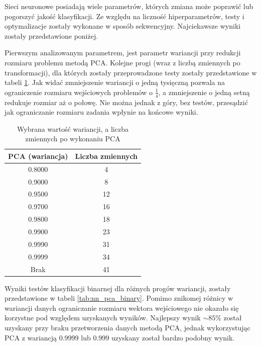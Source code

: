 \documentclass[a4paper, twoside, 11pt, openright]{article}
\begin{document}
Sieci neuronowe posiadają wiele parametrów, których zmiana może poprawić lub pogorszyć jakość klasyfikacji. Ze względu na liczność hiperparametrów, testy i optymalizacje zostały wykonane w sposób sekwencyjny. Najciekawsze wyniki zostały przedstawione poniżej.

\bigskip

Pierwszym analizowanym parametrem, jest parametr wariancji przy redukcji rozmiaru problemu metodą PCA. Kolejne progi (wraz z liczbą zmiennych po transformacji), dla których zostały przeprowadzone testy zostały przedstawione w tabeli \ref{tab:pca_component_number}. Jak widać zmniejszenie wariancji o jedną tysięczną pozwala na ograniczenie rozmiaru wejściowych problemów o $\frac{1}{4}$, a zmniejszenie o jedną setną redukuje rozmiar aż o połowę. Nie można jednak z góry, bez testów, przesądzić jak ograniczanie rozmiaru zadania wpłynie na końcowe wyniki. 

\begin{table}[H]
    \centering
    \begin{tabular}{|c|c|}
    \hline
        \textbf{PCA (wariancja)} & \textbf{Liczba zmiennych} \\ \hline
        0.8000 & 4 \\ \hline 
        0.9000 & 8 \\ \hline 
        0.9500 & 12 \\ \hline 
        0.9700 & 16 \\ \hline 
        0.9800 & 18 \\ \hline 
        0.9900 & 23 \\ \hline
        0.9990 & 31 \\ \hline 
        0.9999 & 34 \\ \hline 
        Brak & 41 \\ \hline 
    \end{tabular}
    \caption{Wybrana wartość wariancji, a liczba zmiennych po wykonaniu PCA}
    \label{tab:pca_component_number}
\end{table}

Wyniki testów klasyfikacji binarnej dla różnych progów wariancji, zostały przedstawione w tabeli \ref{tab:nn_pca_binary}. Pomimo znikomej różnicy w wariancji danych ograniczanie rozmiaru wektora wejściowego nie okazało się korzystne pod względem uzyskanych wyników. Najlepszy wynik $\sim
85\%$ został uzyskany przy braku przetworzenia danych metodą PCA, jednak  wykorzystując PCA z wariancją 0.9999 lub 0.999 uzyskany został bardzo podobny wynik.
\end{document}
